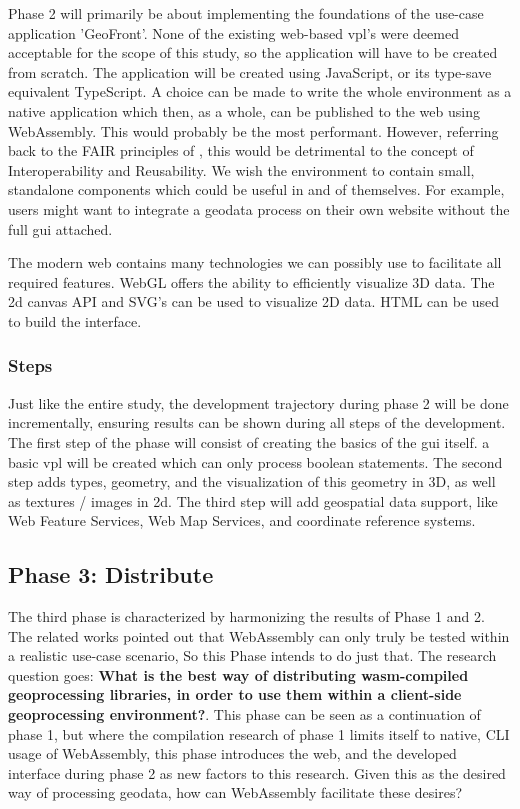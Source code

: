 Phase 2 will primarily be about implementing the foundations of the use-case application 'GeoFront'. None of the existing web-based \ac{vpl}'s were deemed acceptable for the scope of this study, so the application will have to be created from scratch. 
The application will be created using JavaScript, or its type-save equivalent TypeScript. 
A choice can be made to write the whole environment as a native application which then, as a whole, can be published to the web using WebAssembly. 
This would probably be the most performant. 
However, referring back to the FAIR principles of \cite{mark_d_wilkinson_fair_2016}, this would be detrimental to the concept of Interoperability and Reusability. 
We wish the environment to contain small, standalone components which could be useful in and of themselves. 
For example, users might want to integrate a geodata process on their own website without the full \ac{gui} attached.

The modern web contains many technologies we can possibly use to facilitate all required features. WebGL offers the ability to efficiently visualize 3D data. The 2d canvas API and SVG's can be used to visualize 2D data. HTML can be used to build the interface.

\subsubsection*{Steps}

Just like the entire study, the development trajectory during phase 2 will be done incrementally, ensuring results can be shown during all steps of the development. 
The first step of the phase will consist of creating the basics of the \ac{gui} itself. a basic \ac{vpl} will be created which can only process boolean statements. The second step adds types, geometry, and the visualization of this geometry in 3D, as well as textures / images in 2d. The third step will add geospatial data support, like Web Feature Services, Web Map Services, and coordinate reference systems.  


\subsection{Phase 3: Distribute}



The third phase is characterized by harmonizing the results of Phase 1 and 2. 
The related works pointed out that WebAssembly can only truly be tested within a realistic use-case scenario, So this Phase intends to do just that.
The research question goes: \textbf{What is the best way of distributing wasm-compiled geoprocessing libraries, in order to use them within a client-side geoprocessing environment?}. 
This phase can be seen as a continuation of phase 1, but where the compilation research of phase 1 limits itself to native, CLI usage of WebAssembly, this phase introduces the web, and the developed interface during phase 2 as new factors to this research. Given this as the desired way of processing geodata, how can WebAssembly facilitate these desires? 

